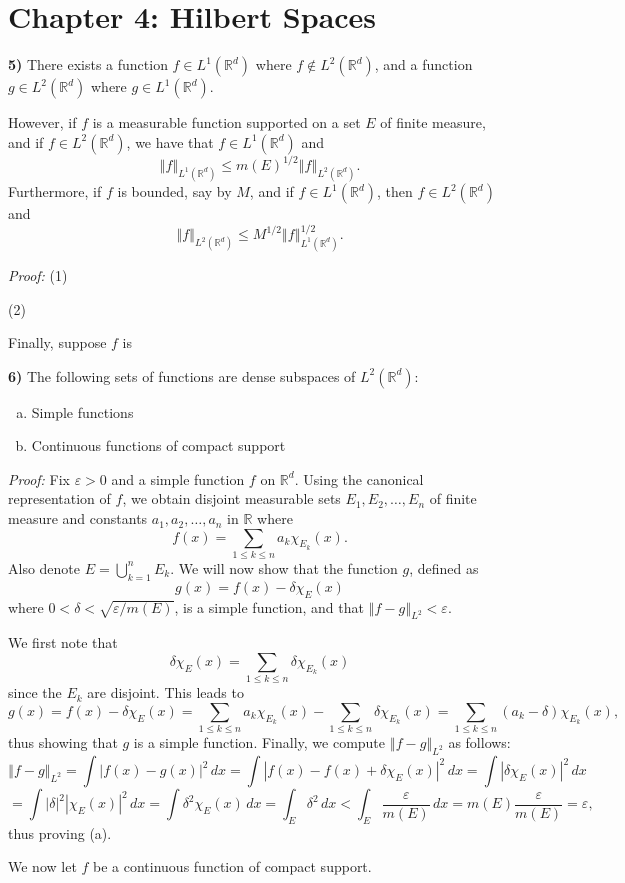 \documentclass[12pt]{article}
\newcommand{\R}{\ensuremath{\mathbb{R}}}
\newcommand{\e}{\ensuremath{\varepsilon}}
\renewcommand{\d}{\ensuremath{\delta}}
\newcommand{\parenb}[1]{\left(#1\right)}
\newcommand{\vertb}[1]{\left\vert#1\right\vert}
\newcommand{\dvertb}[1]{\left\Vert#1\right\Vert}
\newcommand{\proof}{\textit{Proof: }}
\begin{document}
\pagestyle{fancy}

\setlength{\parindent}{0in}
\setlength{\parskip}{0.1in}

\section*{Chapter 4: Hilbert Spaces}

\textbf{5)}
There exists a function \( f \in L^1(\R^d) \) where \( f \notin L^2(\R^d) \),
and a function \( g \in L^2(\R^d) \) where \( g \in L^1(\R^d) \).

However, if \( f \) is a measurable function supported on a set \( E \) of
finite measure, and if \( f \in L^2(\R^d) \), we have that
\( f \in L^1(\R^d) \) and
\[
	\dvertb{f}_{L^1(\R^d)}
	\leq m(E)^{1/2} \dvertb{f}_{L^2(\R^d)}.
\]
Furthermore, if \( f \) is bounded, say by \( M \), and if
\( f \in L^1(\R^d) \), then \( f \in L^2(\R^d) \) and
\[
	\dvertb{f}_{L^2(\R^d)}
	\leq M^{1/2} \dvertb{f}_{L^1(\R^d)}^{1/2}.
\]

\proof
(1)

(2)

Finally, suppose \( f \) is

\textbf{6)}
The following sets of functions are dense subspaces of \( L^2(\R^d) \):
\begin{enumerate}[(a)]
	\item Simple functions

	\item Continuous functions of compact support
\end{enumerate}

\proof
Fix \( \e > 0 \) and a simple function \( f \) on \( \R^d \).
Using the canonical representation of \( f \), we obtain disjoint measurable
sets \( E_1, E_2, \dots, E_n \) of finite measure and constants
\( a_1, a_2, \dots, a_n \) in \( \R \) where
\[
	f(x) = \sum_{1 \leq k \leq n} a_k\chi_{E_k}(x).
\]
Also denote \( E = \bigcup_{k = 1}^n E_k \).
We will now show that the function \( g \), defined as
\[
	g(x) = f(x) - \d\chi_{E}(x)
\]
where \( 0 < \d < \sqrt{\e/m(E)} \), is a simple function, and that
\( \dvertb{f - g}_{L^2} < \e \).

We first note that
\[
	\d\chi_{E}(x)
	= \sum_{1 \leq k \leq n} \d\chi_{E_k}(x)
\]
since the \( E_k \) are disjoint.
This leads to
\[
	g(x)
	= f(x) - \d\chi_{E}(x)
	= \sum_{1 \leq k \leq n} a_k\chi_{E_k}(x)
	- \sum_{1 \leq k \leq n} \d\chi_{E_k}(x)
	= \sum_{1 \leq k \leq n} \parenb{a_k - \d}\chi_{E_k}(x),
\]
thus showing that \( g \) is a simple function.
Finally, we compute \( \dvertb{f - g}_{L^2} \) as follows:
\[
	\dvertb{f - g}_{L^2}
	= \int \vertb{f(x) - g(x)}^2 \, dx
	= \int \vertb{f(x) - f(x) + \d\chi_{E}(x)}^2 \, dx
	= \int \vertb{\d\chi_{E}(x)}^2 \, dx
\]
\[
	= \int \vertb{\d}^2 \vertb{\chi_E(x)}^2 \, dx
	= \int \delta^2 \chi_E(x) \, dx
	= \int_E \delta^2 \, dx
	< \int_E \frac{\e}{m(E)} \, dx
	= m(E)\frac{\e}{m(E)}
	= \e,
\]
thus proving (a).

We now let \( f \) be a continuous function of compact support.
\end{document}

